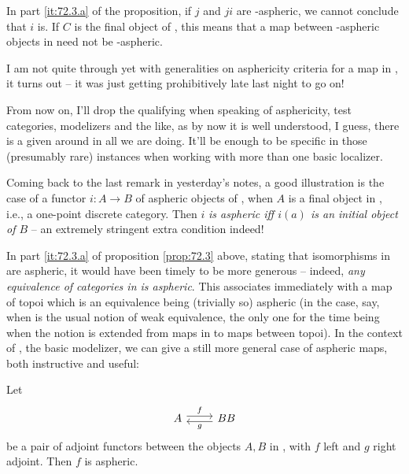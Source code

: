 \begin{remarknum}
  In part \ref{it:72.3.a} of the proposition, if $j$ and $ji$ are
  \scrW-aspheric, we cannot conclude that $i$ is. If $C$ is the final
  object of \Cat, this means that a map between \scrW-aspheric objects
  in \Cat{} need not be \scrW-aspheric.
\end{remarknum}

\bigbreak

\noindent\hfill{}\par

%
\label{sec:73}%
I am not quite through yet with generalities on asphericity criteria
for a map in \Cat, it turns out -- it was just getting prohibitively
late last night to go on!

From now on, I'll drop the qualifying \scrW{} when speaking of
asphericity, test categories, modelizers and the like, as by now it is
well understood, I guess, there is a given \scrW{} around in all we
are doing. It'll be enough to be specific in those (presumably rare)
instances when working with more than one basic localizer.

Coming back to the last remark in yesterday's notes, a good
illustration is the case of a functor $i:A\to B$ of aspheric objects
of \Cat, when $A$ is a final object in \Cat, i.e., a one-point
discrete category. Then $i$ \emph{is aspheric if{f} $i(a)$ is an
  initial object of $B$} -- an extremely stringent extra condition
indeed!

In part \ref{it:72.3.a} of proposition \ref{prop:72.3} above, stating
that isomorphisms in \Cat{} are aspheric, it would have been timely to
be more generous -- indeed, \emph{any equivalence of categories in
  \Cat{} is aspheric}. This associates immediately with a map of topoi
which is an equivalence being (trivially so) aspheric (in the case,
say, when \scrW{} is the usual notion of weak equivalence, the only
one for the time being when the notion is extended from maps in \Cat{}
to maps between topoi). In the context of \Cat, the basic modelizer,
we can give a still more general case of aspheric maps, both
instructive and useful:
\addtocounter{propositionnum}{3}
\begin{propositionnum}\label{prop:73.4}
  Let
  \[\begin{tikzcd}
    A \ar[r,shift left,"f"] & B \ar[l,shift left,"g"] B
  \end{tikzcd}\]
  be a pair of adjoint functors between the objects $A,B$ in \Cat,
  with $f$ left and $g$ right adjoint. Then $f$ is aspheric.
\end{propositionnum}

